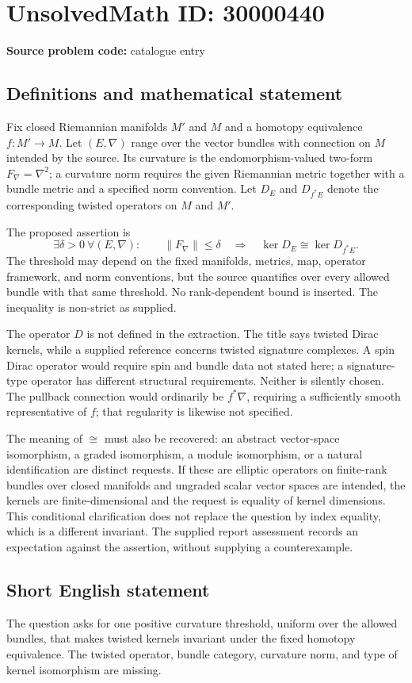 \documentclass[11pt]{article}
\begin{document}
\section*{UnsolvedMath ID: 30000440}
\textbf{Source problem code:} catalogue entry
\subsection{Definitions and mathematical statement}
Fix closed Riemannian manifolds $M'$ and $M$ and a homotopy equivalence $f:M'\to M$. Let $(E,\nabla)$ range over the vector bundles with connection on $M$ intended by the source. Its curvature is the endomorphism-valued two-form $F_\nabla=\nabla^2$; a curvature norm requires the given Riemannian metric together with a bundle metric and a specified norm convention. Let $D_E$ and $D_{f^*E}$ denote the corresponding twisted operators on $M$ and $M'$.

The proposed assertion is
\[
 \exists\delta>0\ \forall(E,\nabla):\qquad
 \|F_\nabla\|\le\delta
 \quad\Longrightarrow\quad
 \ker D_E\cong\ker D_{f^*E}.
\]
The threshold may depend on the fixed manifolds, metrics, map, operator framework, and norm conventions, but the source quantifies over every allowed bundle with that same threshold. No rank-dependent bound is inserted. The inequality is non-strict as supplied.

The operator $D$ is not defined in the extraction. The title says twisted Dirac kernels, while a supplied reference concerns twisted signature complexes. A spin Dirac operator would require spin and bundle data not stated here; a signature-type operator has different structural requirements. Neither is silently chosen. The pullback connection would ordinarily be $f^*\nabla$, requiring a sufficiently smooth representative of $f$; that regularity is likewise not specified.

The meaning of $\cong$ must also be recovered: an abstract vector-space isomorphism, a graded isomorphism, a module isomorphism, or a natural identification are distinct requests. If these are elliptic operators on finite-rank bundles over closed manifolds and ungraded scalar vector spaces are intended, the kernels are finite-dimensional and the request is equality of kernel dimensions. This conditional clarification does not replace the question by index equality, which is a different invariant. The supplied report assessment records an expectation against the assertion, without supplying a counterexample.
\subsection{Short English statement}
The question asks for one positive curvature threshold, uniform over the allowed bundles, that makes twisted kernels invariant under the fixed homotopy equivalence. The twisted operator, bundle category, curvature norm, and type of kernel isomorphism are missing.
\end{document}
